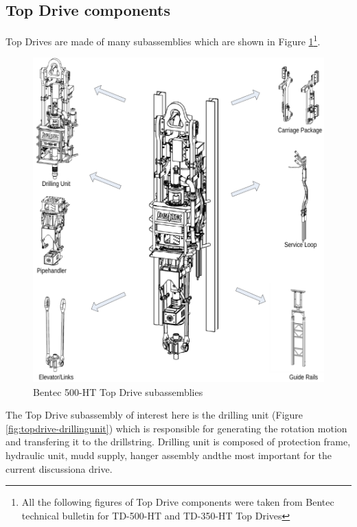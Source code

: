 \subsection{Top Drive components}%
\label{sub:top_drive_components}

Top Drives are made of many subassemblies which are shown in Figure \ref{fig:topdrive-subassemblies}\footnote{All the following figures of Top Drive components were taken from Bentec technical bulletin for TD-500-HT and TD-350-HT Top Drives}.

\begin{figure}[h]
	\centering
	\includegraphics[width=\linewidth]{figures/topdrive_subassemblies.png}
	\caption{Bentec 500-HT Top Drive subassemblies}%
	\label{fig:topdrive-subassemblies}
\end{figure}

The Top Drive subassembly of interest here is the drilling unit (Figure \ref{fig:topdrive-drillingunit}) which is responsible for generating the rotation motion and transfering it to the drillstring. Drilling unit is composed of protection frame, hydraulic unit, mudd supply, hanger assembly and\textemdash the most important for the current discussion\textemdash a drive.

